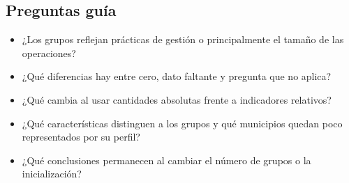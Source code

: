 \documentclass[a4,11pt]{aleph-notas}
\begin{document}
\subsection*{Preguntas guía}
\begin{itemize}[leftmargin=*]
    \item ¿Los grupos reflejan prácticas de gestión o principalmente el tamaño de las operaciones?
    \item ¿Qué diferencias hay entre cero, dato faltante y pregunta que no aplica?
    \item ¿Qué cambia al usar cantidades absolutas frente a indicadores relativos?
    \item ¿Qué características distinguen a los grupos y qué municipios quedan poco representados por su perfil?
    \item ¿Qué conclusiones permanecen al cambiar el número de grupos o la inicialización?
\end{itemize}
\end{document}
